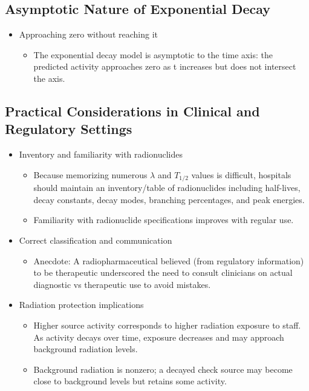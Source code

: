 \documentclass[11pt,a4paper]{article}
\let\originalsubsection\subsection
\renewcommand{\subsection}{\Needspace{8\baselineskip}\originalsubsection}
\begin{document}
\subsection{Asymptotic Nature of Exponential Decay}
\begin{itemize}
\item Approaching zero without reaching it
\begin{itemize}
\item The exponential decay model is asymptotic to the time axis: the predicted activity approaches zero as t increases but does not intersect the axis.
\end{itemize}
\end{itemize}
\subsection{Practical Considerations in Clinical and Regulatory Settings}
\begin{itemize}
\item Inventory and familiarity with radionuclides
\begin{itemize}
\item Because memorizing numerous \ensuremath{\lambda} and \(T_{1/2}\) values is difficult, hospitals should maintain an inventory/table of radionuclides including half-lives, decay constants, decay modes, branching percentages, and peak energies.
\item Familiarity with radionuclide specifications improves with regular use.
\end{itemize}
\item Correct classification and communication
\begin{itemize}
\item Anecdote: A radiopharmaceutical believed (from regulatory information) to be therapeutic underscored the need to consult clinicians on actual diagnostic vs therapeutic use to avoid mistakes.
\end{itemize}
\item Radiation protection implications
\begin{itemize}
\item Higher source activity corresponds to higher radiation exposure to staff. As activity decays over time, exposure decreases and may approach background radiation levels.
\item Background radiation is nonzero; a decayed check source may become close to background levels but retains some activity.
\end{itemize}
\end{itemize}
\end{document}
